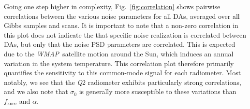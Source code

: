 \documentclass[twocolumn]{../../common/aa}
\def\WMAP{\emph{WMAP}}
\newcommand{\Q}[0]{\textit Q}
\begin{document}
Going one step higher in complexity, Fig.~\ref{fig:correlation} shows pairwise correlations between the various noise parameters for all DAs, averaged over all Gibbs samples and scans. It is important to note that a non-zero correlation in this plot does not indicate the that specific noise realization is correlated between DAs, but only that the noise PSD parameters are correlated. This is expected due to the \WMAP\ satellite motion around the Sun, which induces an annual variation in the system temperature. This correlation plot therefore primarily quantifies the sensitivity to this common-mode signal for each radiometer. Most notably, we see that the \Q2 radiometer exhibits particularly strong correlations, and we also note that $\sigma_0$ is generally more susceptible to these variations than $f_{\mathrm{knee}}$ and $\alpha$. 
\end{document}
